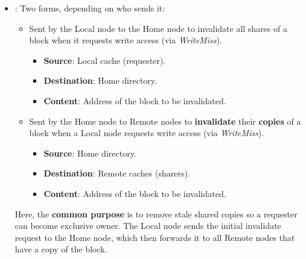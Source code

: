 \begin{itemize}
    \item {}: Two forms, depending on who sends it:
    \begin{itemize}
        \item Sent by the Local node to the Home node to invalidate all shares of a block when it requests write access (via \emph{WriteMiss}).
        \begin{itemize}
            \item [\textcolor{Green3}{\faIcon{arrow-right}}] \textcolor{Green3}{\textbf{Source}}: Local cache (requester).
            \item [\textcolor{Green3}{\faIcon{arrow-left}}] \textcolor{Green3}{\textbf{Destination}}: Home directory.
            \item [\textcolor{Green3}{\faIcon{file-alt}}] \textcolor{Green3}{\textbf{Content}}: Address of the block to be invalidated.
        \end{itemize}
        \item Sent by the Home node to Remote nodes to \textbf{invalidate} their \textbf{copies} of a block when a Local node requests write access (via \emph{WriteMiss}).
        \begin{itemize}
            \item [\textcolor{Green3}{\faIcon{arrow-right}}] \textcolor{Green3}{\textbf{Source}}: Home directory.
            \item [\textcolor{Green3}{\faIcon{arrow-left}}] \textcolor{Green3}{\textbf{Destination}}: Remote caches (sharers).
            \item [\textcolor{Green3}{\faIcon{file-alt}}] \textcolor{Green3}{\textbf{Content}}: Address of the block to be invalidated.
        \end{itemize}
    \end{itemize}
    Here, the \textbf{common purpose} is to remove stale shared copies so a requester can become exclusive owner. The Local node sends the initial invalidate request to the Home node, which then forwards it to all Remote nodes that have a copy of the block.

    \newpage


\end{itemize}
